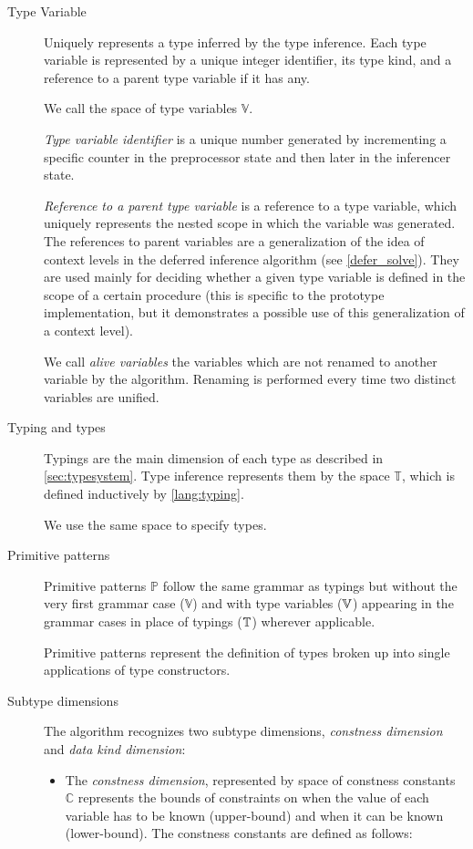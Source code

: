 \begin{description}
    \item[Type Variable] Uniquely represents a type inferred by the type inference. Each type variable is represented by a unique integer identifier, its type kind, and a reference to a parent type variable if it has any.

    We call the space of type variables $\mathbb{V}$.

    \emph{Type variable identifier} is a unique number generated by incrementing a specific counter in the preprocessor state and then later in the inferencer state.

    \emph{Reference to a parent type variable} is a reference to a type variable, which uniquely represents the nested scope in which the variable was generated. The references to parent variables are a generalization of the idea of context levels in the deferred inference algorithm (see \cref{defer_solve}). They are used mainly for deciding whether a given type variable is defined in the scope of a certain procedure (this is specific to the prototype implementation, but it demonstrates a possible use of this generalization of a context level).

    We call \emph{alive variables} the variables which are not renamed to another variable by the algorithm. Renaming is performed every time two distinct variables are unified.

    \item[Typing and types] Typings are the main dimension of each type as described in \cref{sec:typesystem}. Type inference represents them by the space $\mathbb{T}$, which is defined inductively by \cref{lang:typing}.

    We use the same space to specify types.

    \item[Primitive patterns] Primitive patterns $\mathbb{P}$ follow the same grammar as typings but without the very first grammar case ($\mathbb{V}$) and with type variables ($\mathbb{V}$) appearing in the grammar cases in place of typings ($\mathbb{T}$) wherever applicable.

    Primitive patterns represent the definition of types broken up into single applications of type constructors.

    \item[Subtype dimensions] The algorithm recognizes two subtype dimensions, \emph{constness dimension} and \emph{data kind dimension}:

    \begin{itemize}
        \item  The \emph{constness dimension}, represented by space of constness constants $\mathbb{C}$ represents the bounds of constraints on when the value of each variable has to be known (upper-bound) and when it can be known (lower-bound). The constness constants are defined as follows:


\end{itemize}
\end{description}
